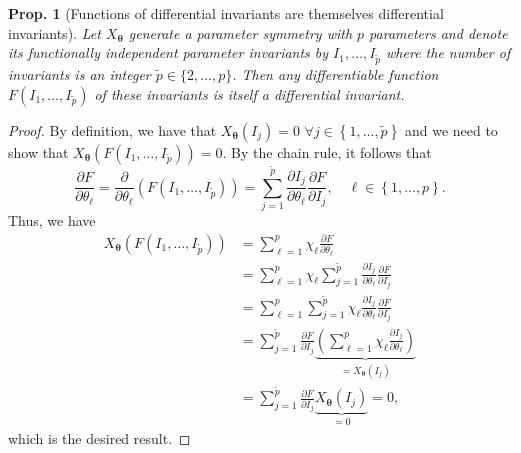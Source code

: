 \documentclass[12pt]{article}
\newtheorem{prop}{Prop.}
\begin{document}
\medskip
\begin{prop}[Functions of differential invariants are themselves differential invariants]
Let $X_{\boldsymbol{\theta}}$ generate a parameter symmetry with $p$ parameters and denote its functionally independent parameter invariants by $I_{1},\ldots,I_{\tilde{p}}$ where the number of invariants is an integer $\tilde{p}\in\{2,\ldots,p\}$. Then any differentiable function $F\left(I_{1},\ldots,I_{\tilde{p}}\right)$ of these invariants is itself a differential invariant.
\label{prop:inv}
\end{prop}
\begin{proof}
By definition, we have that $X_{\boldsymbol{\theta}}(I_{j})=0$ $\forall j\in\left\{1,\ldots,\tilde{p}\right\}$ and we need to show that $X_{\boldsymbol{\theta}}\left(F\left(I_{1},\ldots,I_{\tilde{p}}\right)\right)=0$. By the chain rule, it follows that
\begin{equation}
\frac{\partial F}{\partial\theta_{\ell}}=\frac{\partial}{\partial\theta_{\ell}}\left(F\left(I_{1},\ldots,I_{\tilde{p}}\right)\right)=\sum_{j=1}^{\tilde{p}}\frac{\partial I_{j}}{\partial\theta_{\ell}}\frac{\partial F}{\partial I_{j}},\quad\ell\in\left\{1,\ldots,p\right\}.
\end{equation}
Thus, we have
\begin{align}
X_{\boldsymbol{\theta}}\left(F\left(I_{1},\ldots,I_{\tilde{p}}\right)\right)&=\sum_{\ell=1}^{p}\chi_{\ell}\frac{\partial F}{\partial\theta_{\ell}}\nonumber\\
&=\sum_{\ell=1}^{p}\chi_{\ell}\sum_{j=1}^{\tilde{p}}\frac{\partial I_{j}}{\partial\theta_{\ell}}\frac{\partial F}{\partial I_{j}}\nonumber\\
&=\sum_{\ell=1}^{p}\sum_{j=1}^{\tilde{p}}\chi_{\ell}\frac{\partial I_{j}}{\partial\theta_{\ell}}\frac{\partial F}{\partial I_{j}}\nonumber\\
    &=\sum_{j=1}^{\tilde{p}}\frac{\partial F}{\partial I_{j}}\underset{=X_{\boldsymbol{\theta}}(I_{j})}{\underbrace{\left(\sum_{\ell=1}^{p}\chi_{\ell}\frac{\partial I_{j}}{\partial\theta_{\ell}}\right)}}\nonumber\\
    &=\sum_{j=1}^{\tilde{p}}\frac{\partial F}{\partial I_{j}}\underset{=0}{\underbrace{X_{\boldsymbol{\theta}}(I_{j})}}=0,
\end{align}
which is the desired result.
\end{proof}
\end{document}

